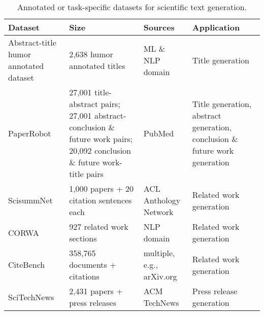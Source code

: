 \begin{table}[th!]
\small
    \centering
    \begin{tabular}{p{2.8cm} p{4.8cm}p{2.8cm}p{3cm}}
    \toprule
       \textbf{Dataset}  & \textbf{Size} & \textbf{Sources} & \textbf{Application} \\
       \midrule
	   Abstract-title humor annotated dataset \cite{chen-eger-2023-transformers} & 2,638 humor annotated titles & ML \& NLP domain & Title generation\\
	   PaperRobot \cite{wang-etal-2019-paperrobot} & 27,001 title-abstract pairs; 27,001 abstract-conclusion \& future work pairs; 20,092 conclusion \& future work-title pairs & PubMed & Title generation, abstract generation, conclusion \& future work generation\\
        ScisummNet \cite{yasunaga2019scisummnet} & 1,000 papers + 20 citation sentences each & ACL Anthology Network & Related work generation\\
CORWA \cite{li-etal-2022-corwa} & 927 related work sections & NLP domain & Related work generation\\
		CiteBench \cite{funkquist-etal-2023-citebench} & 358,765 documents + citations & multiple, e.g., arXiv.org & Related work generation\\
		SciTechNews \cite{cardenas-etal-2023-dont} & 2,431 papers + press releases & ACM TechNews & Press release generation\\
\bottomrule
    \end{tabular}
    \caption{Annotated or task-specific datasets for scientific text generation.}
    \label{tab:data_text_generation}
\end{table}

